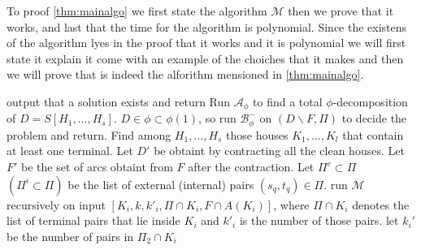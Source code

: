 To proof \autoref{thm:mainalgo} we first state the algorithm $\mathcal{M}$ then we prove that it works, and last that the time for the algorithm is polynomial. Since the existens of the algorithm lyes in the proof that it works and it is polynomial we will first state it explain it come with an example of the choiches that it makes and then we will prove that is indeed the alforithm mensioned in \autoref{thm:mainalgo}.
\begin{algorithm}   
    \begin{algorithmic}[1]
        \IF{$\Pi=\emptyset$}
            \STATE output that a solution exists and return
        \ENDIF
        \STATE Run $\mathcal{A}_{\phi}$ to find a total $\phi$-decomposition of $D=S[H_1,\dots,H_s]$.
            \STATE $D\in \phi\subset \phi(1)$, so run $\mathcal{B}^-_{\phi}$ on $(D\backslash F,\Pi)$ to decide the problem and return.
        \ENDIF
        \STATE Find among $H_1,\dots, H_s$ those houses $K_1,\dots , K_l$ that contain at least one terminal. 
        Let $D'$ be obtaint by contracting all the clean houses. 
        Let $F'$ be the set of arcs obtaint from $F$ after the contraction.
        \STATE Let $\Pi^e\subset \Pi$ $(\Pi^i\subset \Pi)$ be the list of external (internal) pairs $(s_q,t_q)\in \Pi$.
             \label{state:6a}
                \STATE run $\mathcal{M}$ recursively on input $[K_i, k, k'_i,\Pi \cap K_i, F\cap A(K_i)]$, where $\Pi \cap K_i$ denotes the list of terminal pairs that lie inside $K_i$ and $k'_i$ is the number of those pairs.
            \ENDIF
             \label{state:6b}
                \STATE let $k_i'$ be the number of pairs in $\Pi _2\cap K_i$
\end{algorithmic}
\end{algorithm}
